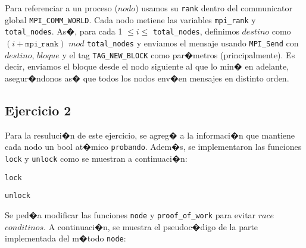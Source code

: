 \documentclass[10pt, a4paper, hidelinks]{article}
\begin{document}
Para referenciar a un proceso ($nodo$) usamos su \texttt{rank} dentro del communicator global \texttt{MPI\_COMM\_WORLD}. Cada nodo metiene las variables \texttt{mpi\_rank} y \texttt{total\_nodes}. As�, para cada 1 $\leq i \leq$ \texttt{total\_nodes}, definimos $destino$ como $(i + \texttt{mpi\_rank})$ $mod$ \texttt{total\_nodes} y enviamos el mensaje usando \texttt{MPI\_Send} con $destino$, $bloque$ y el tag \texttt{TAG\_NEW\_BLOCK} como par�metros (principalmente). Es decir, enviamos el bloque desde el nodo siguiente al que lo min� en adelante, asegur�ndonos as� que todos los nodos env�en mensajes en distinto orden.

\subsection{Ejercicio 2}
Para la resuluci�n de este ejercicio, se agreg� a la informaci�n que mantiene cada nodo un bool at�mico \texttt{probando}. Adem�s, se implementaron las funciones \texttt{lock} y \texttt{unlock} como se muestran a continuaci�n:

\begin{algorithm}[H]
\SetAlgoLined
{}
\caption{\texttt{lock}}
\end{algorithm}

\begin{algorithm}[H]
\SetAlgoLined
{}
\caption{\texttt{unlock}}
\end{algorithm}

Se ped�a modificar las funciones \texttt{node} y \texttt{proof\_of\_work} para evitar $race$ $conditinos$. A continuaci�n, se muestra el pseudoc�digo de la parte implementada del m�todo \texttt{node}:
\end{document}
